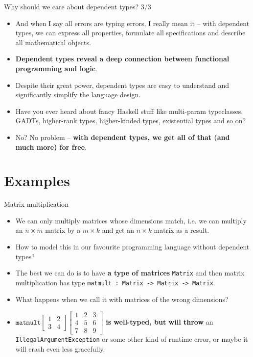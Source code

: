 \documentclass{beamer}
\newcommand{\m}[1]{\texttt{#1}}
\begin{document}
\begin{frame}{Why should we care about dependent types? 3/3}
\begin{itemize}
	\item And when I say all errors are typing errors, I really mean it -- with dependent types, we can express all properties, formulate all specifications and describe all mathematical objects.
	\item \textbf{Dependent types reveal a deep connection between functional programming and logic}.
	\item Despite their great power, dependent types are easy to understand and significantly simplify the language design.
	\item Have you ever heard about fancy Haskell stuff like multi-param typeclasses, GADTs, higher-rank types, higher-kinded types, existential types and so on?
	\item No? No problem -- \textbf{with dependent types, we get all of that (and much more) for free}.
\end{itemize}
\end{frame}

\section{Examples}

\begin{frame}{Matrix multiplication}
\begin{itemize}
	\item We can only multiply matrices whose dimensions match, i.e. we can multiply an $n \times m$ matrix by a $m \times k$ and get an $n \times k$ matrix as a result.
	\item How to model this in our favourite programming language without dependent types?
	\item The best we can do is to have \textbf{a type of matrices} \m{Matrix} and then matrix multiplication has type \m{matmult :\ Matrix -> Matrix -> Matrix}.
	\item What happens when we call it with matrices of the wrong dimensions?
	\item $\m{matmult} \begin{bmatrix}1 & 2\\3 & 4\end{bmatrix} \begin{bmatrix}1 & 2 & 3\\4 & 5 & 6\\7 & 8 & 9\end{bmatrix}$ \textbf{is well-typed, but will throw} an \m{IllegalArgumentException} or some other kind of runtime error, or maybe it will crash even less gracefully.
\end{itemize}
\end{frame}
\end{document}
